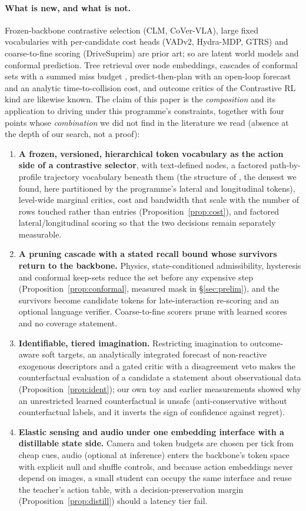 \paragraph{What is new, and what is not.}
Frozen-backbone contrastive selection (CLM, CoVer-VLA), large fixed vocabularies with per-candidate cost heads (VADv2, Hydra-MDP, GTRS) and coarse-to-fine scoring (DriveSuprim) are prior art; so are latent world models and conformal prediction.
Tree retrieval over node embeddings, cascades of conformal sets with a summed miss budget \citep{fisch2021cascade}, predict-then-plan with an open-loop forecast and an analytic time-to-collision cost, and outcome critics of the Contrastive RL kind are likewise known. The claim of this paper is the \emph{composition} and its application to driving under this programme's constraints, together with four points whose \emph{combination} we did not find in the literature we read (absence at the depth of our search, not a proof):
\begin{enumerate}
\item \textbf{A frozen, versioned, hierarchical token vocabulary as the action side of a contrastive selector}, with text-defined nodes, a factored path-by-profile trajectory vocabulary beneath them (the structure of \citet{sun2026sparsedrivev2}, the densest we found, here partitioned by the programme's lateral and longitudinal tokens), level-wide marginal critics, cost and bandwidth that scale with the number of rows touched rather than entries (Proposition~\ref{prop:cost}), and factored lateral/longitudinal scoring so that the two decisions remain separately measurable.
\item \textbf{A pruning cascade with a stated recall bound whose survivors return to the backbone.} Physics, state-conditioned admissibility, hysteresis and conformal keep-sets reduce the set before any expensive step (Proposition~\ref{prop:conformal}, measured mask in \S\ref{sec:prelim}), and the survivors become candidate tokens for late-interaction re-scoring and an optional language verifier. Coarse-to-fine scorers prune with learned scores and no coverage statement.
\item \textbf{Identifiable, tiered imagination.} Restricting imagination to outcome-aware soft targets, an analytically integrated forecast of non-reactive exogenous descriptors and a gated critic with a disagreement veto makes the counterfactual evaluation of a candidate a statement about observational data (Proposition~\ref{prop:ident}); our own toy and earlier measurements showed why an unrestricted learned counterfactual is unsafe (anti-conservative without counterfactual labels, and it inverts the sign of confidence against regret).
\item \textbf{Elastic sensing and audio under one embedding interface with a distillable state side.} Camera and token budgets are chosen per tick from cheap cues, audio (optional at inference) enters the backbone's token space with explicit null and shuffle controls, and because action embeddings never depend on images, a small student can occupy the same interface and reuse the teacher's action table, with a decision-preservation margin (Proposition~\ref{prop:distill}) should a latency tier fail.
\end{enumerate}
